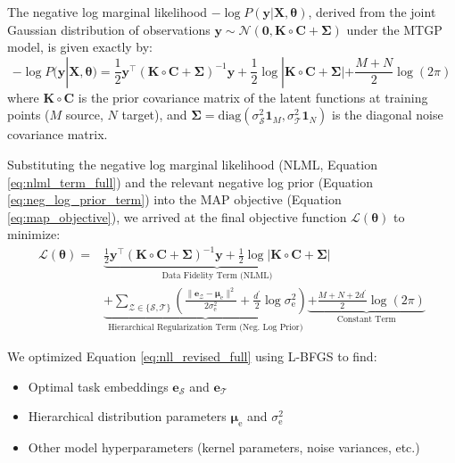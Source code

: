 \documentclass[preprint,12pt]{elsarticle}
\begin{document}
The negative log marginal likelihood $-\log P(\mathbf{y} | \mathbf{X}, \boldsymbol{\theta})$, derived from the joint Gaussian distribution of observations $\mathbf{y} \sim \mathcal{N}(\mathbf{0}, \mathbf{K}\circ \mathbf{C} + \mathbf{\Sigma})$ under the MTGP model, is given exactly by:
\begin{equation}
    \label{eq:nlml_term_full}
    -\log P(\mathbf{y} | \mathbf{X}, \boldsymbol{\theta}) = \frac{1}{2}\mathbf{y}^\intercal (\mathbf{K}\circ \mathbf{C}  + \mathbf{\Sigma})^{-1}\mathbf{y} + \frac{1}{2}\log|\mathbf{K}\circ \mathbf{C} + \mathbf{\Sigma}| + \frac{M+N}{2} \log(2\pi)
\end{equation}
where $\mathbf{K} \circ \mathbf{C}$ is the prior covariance matrix of the latent functions at training points ($M$ source, $N$ target), and $\bm\Sigma = \text{diag}(\sigma_\mathcal{S}^2 \mathbf{1}_M, \sigma_\mathcal{T}^2 \mathbf{1}_N)$ is the diagonal noise covariance matrix.

Substituting the negative log marginal likelihood (NLML, Equation \ref{eq:nlml_term_full}) and the relevant negative log prior (Equation \ref{eq:neg_log_prior_term}) into the MAP objective (Equation \ref{eq:map_objective}), we arrived at the final objective function $\mathcal{L}(\boldsymbol{\theta})$ to minimize:
\begin{align}
\mathcal{L}(\boldsymbol{\theta}) = & \underbrace{\frac{1}{2}\mathbf{y}^\intercal (\mathbf{K}\circ \mathbf{C}  + \mathbf{\Sigma})^{-1}\mathbf{y} + \frac{1}{2}\log|\mathbf{K}\circ \mathbf{C} + \mathbf{\Sigma}|}_{\text{Data Fidelity Term (NLML)}} \nonumber \\
& \underbrace{+ \sum_{\mathcal{Z} \in \{\mathcal{S}, \mathcal{T}\}} \left( \frac{\| \mathbf{e}_\mathcal{Z} - \bm\mu_{\text{e}} \|^2}{2\sigma^2_{\text{e}}} + \frac{d^\prime}{2} \log \sigma^2_{\text{e}} \right)}_{\text{Hierarchical Regularization Term (Neg. Log Prior)}}  \underbrace{+ \frac{M+N+2d^\prime}{2} \log(2\pi)}_{\text{Constant Term}} \label{eq:nll_revised_full}
\end{align}


We optimized Equation \ref{eq:nll_revised_full} using L-BFGS to find:
\begin{itemize}
    \item Optimal task embeddings $\mathbf{e}_\mathcal{S}$ and $\mathbf{e}_\mathcal{T}$
    \item Hierarchical distribution parameters $\bm{\mu}_{\text{e}}$ and $\sigma^2_{\text{e}}$
    \item Other model hyperparameters (kernel parameters, noise variances, etc.)
\end{itemize}
\end{document}
